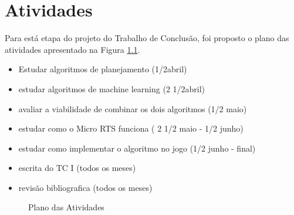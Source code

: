 \chapter{\label{chap:ativ}Atividades}

Para está etapa do projeto do Trabalho de Conclusão, foi proposto o plano das atividades apresentado na Figura \ref{fig:ativ}.

\begin{itemize}
\item Estudar algoritmos de planejamento (1/2abril)
\item estudar algoritmos de machine learning (2 1/2abril)
\item avaliar a viabilidade de combinar os dois algoritmos (1/2 maio)
\item estudar como o Micro RTS funciona ( 2 1/2 maio - 1/2 junho)
\item estudar como implementar o algoritmo no jogo (1/2 junho - final)
\item escrita do TC I (todos os meses)
\item revisão bibliografica (todos os meses)
\end{itemize} 

\begin{figure}[ht]
\centering
\caption{Plano das Atividades}
\label{fig:ativ}
\end{figure}

